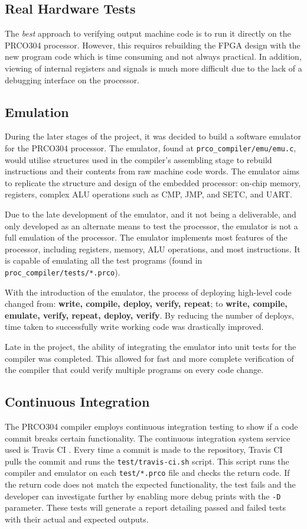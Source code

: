\documentclass[11pt,a4paper]{report}
\newcommand{\scname}{PRCO304}
\begin{document}
\subsection*{Real Hardware Tests}
The \textit{best} approach to verifying output machine code is to run it directly on the \scname{} processor. However, this requires rebuilding the FPGA design with the new program code which is time consuming and not always practical. In addition, viewing of internal registers and signals is much more difficult due to the lack of a debugging interface on the processor.
 
\subsection*{Emulation}
During the later stages of the project, it was decided to build a software emulator for the \scname{} processor. The emulator, found at \verb|prco_compiler/emu/emu.c|, would utilise structures used in the compiler's assembling stage to rebuild instructions and their contents from raw machine code words. The emulator aims to replicate the structure and design of the embedded processor: on-chip memory, registers, complex ALU operations such as CMP, JMP, and SETC, and UART.

Due to the late development of the emulator, and it not being a deliverable, and only developed as an alternate means to test the processor, the emulator is not a full emulation of the processor. The emulator implements most features of the processor, including registers, memory, ALU operations, and most instructions. It is capable of emulating all the test programs (found in \verb|proc_compiler/tests/*.prco|).

With the introduction of the emulator, the process of deploying high-level code changed from: \textbf{write, compile, deploy, verify, repeat}; to \textbf{write, compile, emulate, verify, repeat, deploy, verify}. By reducing the number of deploys, time taken to successfully write working code was drastically improved.

Late in the project, the ability of integrating the emulator into unit tests for the compiler was completed. This allowed for fast and more complete verification of the compiler that could verify multiple programs on every code change.

\subsection*{Continuous Integration}
The \scname{} compiler employs continuous integration testing to show if a code commit breaks certain functionality. The continuous integration system service used is Travis CI \cite{travisci}. Every time a commit is made to the repository, Travis CI pulls the commit and runs the \verb|test/travis-ci.sh| script. This script runs the compiler and emulator on each \verb|test/*.prco| file and checks the return code. If the return code does not match the expected functionality, the test fails and the developer can investigate further by enabling more debug prints with the \verb|-D| parameter. These tests will generate a report detailing passed and failed tests with their actual and expected outputs. 
\end{document}
